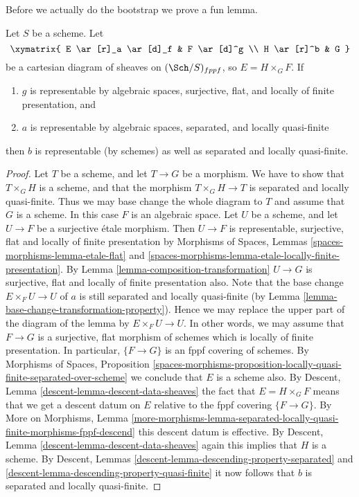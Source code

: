 \medskip\noindent
Before we actually do the bootstrap we prove a fun lemma.

\begin{lemma}
\label{lemma-after-fppf-sep-lqf}
Let $S$ be a scheme.
Let
$$
\xymatrix{
E \ar[r]_a \ar[d]_f & F \ar[d]^g \\
H \ar[r]^b & G
}
$$
be a cartesian diagram of sheaves on $(\Sch/S)_{fppf}$, so
$E = H \times_G F$. If
\begin{enumerate}
\item $g$ is representable by algebraic spaces, surjective, flat, and
locally of finite presentation, and
\item $a$ is representable by algebraic spaces, separated, and
locally quasi-finite
\end{enumerate}
then $b$ is representable (by schemes) as well as separated and
locally quasi-finite.
\end{lemma}

\begin{proof}
Let $T$ be a scheme, and let $T \to G$ be a morphism.
We have to show that $T \times_G H$ is a scheme, and that
the morphism $T \times_G H \to T$ is separated and
locally quasi-finite. Thus we may base change the whole diagram to $T$
and assume that $G$ is a scheme. In this case $F$ is an algebraic space.
Let $U$ be a scheme, and let $U \to F$ be a surjective \'etale morphism.
Then $U \to F$ is representable, surjective, flat and
locally of finite presentation by
Morphisms of Spaces,
Lemmas \ref{spaces-morphisms-lemma-etale-flat} and
\ref{spaces-morphisms-lemma-etale-locally-finite-presentation}.
By
Lemma \ref{lemma-composition-transformation}
$U \to G$ is surjective, flat and locally of finite presentation also.
Note that the base change $E \times_F U \to U$ of $a$ is still
separated and locally quasi-finite (by
Lemma \ref{lemma-base-change-transformation-property}). Hence we
may replace the upper part of the diagram of the lemma by
$E \times_F U \to U$. In other words, we may assume that
$F \to G$ is a surjective, flat morphism of schemes
which is locally of finite presentation.
In particular, $\{F \to G\}$ is an fppf covering of schemes.
By
Morphisms of Spaces, Proposition
\ref{spaces-morphisms-proposition-locally-quasi-finite-separated-over-scheme}
we conclude that $E$ is a scheme also.
By
Descent, Lemma \ref{descent-lemma-descent-data-sheaves}
the fact that $E = H \times_G F$ means that we get a descent datum
on $E$ relative to the fppf covering $\{F \to G\}$.
By
More on Morphisms, Lemma
\ref{more-morphisms-lemma-separated-locally-quasi-finite-morphisms-fppf-descend}
this descent datum is effective.
By
Descent, Lemma \ref{descent-lemma-descent-data-sheaves}
again this implies that $H$ is a scheme.
By
Descent, Lemmas \ref{descent-lemma-descending-property-separated} and
\ref{descent-lemma-descending-property-quasi-finite}
it now follows that $b$ is separated and locally quasi-finite.
\end{proof}

